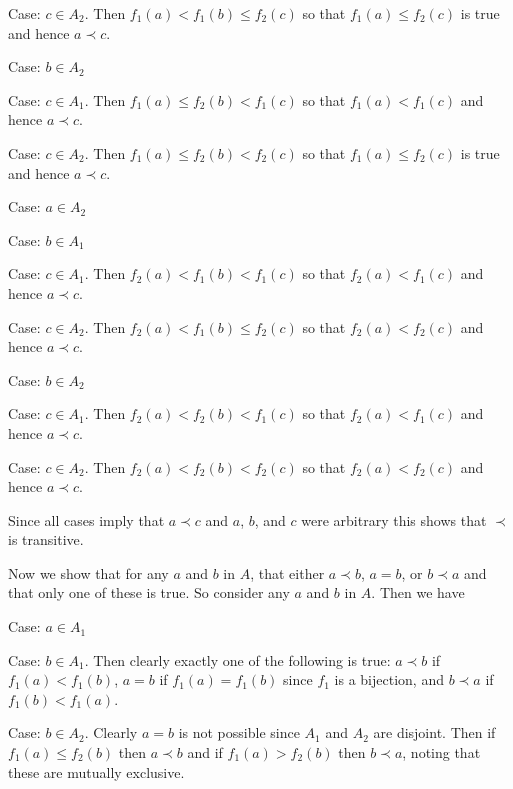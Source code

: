 \begin{solution}
\begin{indpar}
\begin{indpar}
            Case: $c \in A_2$.
            Then $f_1(a) < f_1(b) \leq f_2(c)$ so that $f_1(a) \leq f_2(c)$ is true and hence $a \prec c$.
        \end{indpar}

        Case: $b \in A_2$
        \begin{indpar}
            Case: $c \in A_1$.
            Then $f_1(a) \leq f_2(b) < f_1(c)$ so that $f_1(a) < f_1(c)$ and hence $a \prec c$.

            Case: $c \in A_2$.
            Then $f_1(a) \leq f_2(b) < f_2(c)$ so that $f_1(a) \leq f_2(c)$ is true and hence $a \prec c$.
        \end{indpar}
    \end{indpar}

    Case: $a \in A_2$
    \begin{indpar}
        Case: $b \in A_1$
        \begin{indpar}
            Case: $c \in A_1$.
            Then $f_2(a) < f_1(b) < f_1(c)$ so that $f_2(a) < f_1(c)$ and hence $a \prec c$.

            Case: $c \in A_2$.
            Then $f_2(a) < f_1(b) \leq f_2(c)$ so that $f_2(a) < f_2(c)$ and hence $a \prec c$.
        \end{indpar}

        Case: $b \in A_2$
        \begin{indpar}
            Case: $c \in A_1$.
            Then $f_2(a) < f_2(b) < f_1(c)$ so that $f_2(a) < f_1(c)$ and hence $a \prec c$.

            Case: $c \in A_2$.
            Then $f_2(a) < f_2(b) < f_2(c)$ so that $f_2(a) < f_2(c)$ and hence $a \prec c$.
        \end{indpar}
    \end{indpar}
    Since all cases imply that $a \prec c$ and $a$, $b$, and $c$ were arbitrary this shows that $\prec$ is transitive.

    Now we show that for any $a$ and $b$ in $A$, that either $a \prec b$, $a = b$, or $b \prec a$ and that only one of these is true.
    So consider any $a$ and $b$ in $A$.
    Then we have

    Case: $a \in A_1$
    \begin{indpar}
        Case: $b \in A_1$.
        Then clearly exactly one of the following is true: $a \prec b$ if $f_1(a) < f_1(b)$, $a = b$ if $f_1(a) = f_1(b)$ since $f_1$ is a bijection, and $b \prec a$ if $f_1(b) < f_1(a)$.

        Case: $b \in A_2$.
        Clearly $a = b$ is not possible since $A_1$ and $A_2$ are disjoint.
        Then if $f_1(a) \leq f_2(b)$ then $a \prec b$ and if $f_1(a) > f_2(b)$ then $b \prec a$, noting that these are mutually exclusive.
    \end{indpar}


\end{solution}
